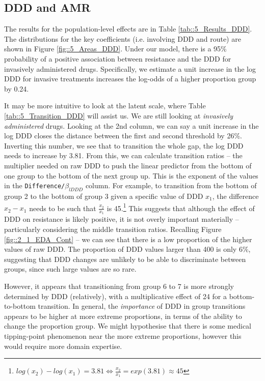 \documentclass[11pt,twoside]{article}
\numberwithin{Theorem}{section}
\numberwithin{Definition}{section}
\numberwithin{Lemma}{section}
\numberwithin{Algorithm}{section}
\numberwithin{equation}{section}
\begin{document}
\subsection{DDD and AMR}

The results for the population-level effects are in Table \ref{tab::5_Results_DDD}. The distributions for the key coefficients (i.e. involving DDD and route) are shown in Figure \ref{fig::5_Areas_DDD}. Under our model, there is a 95\% probability of a positive association between resistance and the DDD for invasively administered drugs. Specifically, we estimate a unit increase in the log DDD for invasive treatments increases the log-odds of a higher proportion group by 0.24.

It may be more intuitive to look at the latent scale, where Table \ref{tab::5_Transition_DDD} will assist us. We are still looking at \textit{invasively administered} drugs. Looking at the 2nd column, we can say a unit increase in the log DDD closes the distance between the first and second threshold by 26\%. Inverting this number, we see that to transition the whole gap, the log DDD needs to increase by 3.81. From this, we can calculate transition ratios -- the multiplier needed on raw DDD to push the linear predictor from the bottom of one group to the bottom of the next group up. This is the exponent of the values in the \texttt{Difference/$\beta_{lDDD}$} column. For example, to transition from the bottom of group 2 to the bottom of group 3 given a specific value of DDD $x_1$, the difference $x_2 - x_1$ needs to be such that $\frac{x_2}{x_1}$ is 45.\footnote{$log(x_2) - log(x_1) = 3.81 \iff \frac{x_2}{x_1} = exp(3.81) \approx 45$} This suggests that although the effect of DDD on resistance is likely positive, it is not overly important materially -- particularly considering the middle transition ratios. Recalling Figure \ref{fig::2_1_EDA_Cont} -- we can see that there is a low proportion of the higher values of raw DDD. The proportion of DDD values larger than 400 is only 6\%, suggesting that DDD changes are unlikely to be able to discriminate between groups, since such large values are so rare. 

However, it appears that transitioning from group 6 to 7 is more strongly determined by DDD (relatively), with a multiplicative effect of 24 for a bottom-to-bottom transition. In general, the \textit{importance} of DDD in group transitions appears to be higher at more extreme proportions, in terms of the ability to change the proportion group. We might hypothesise that there is some medical tipping-point phenomenon near the more extreme proportions, however this would require more domain expertise. 
\end{document}
